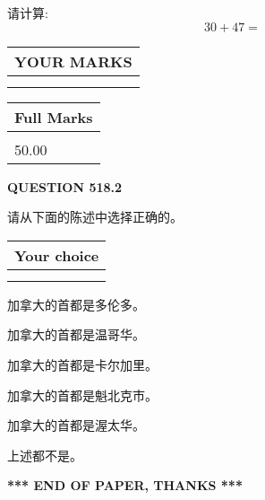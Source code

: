 \documentclass{ctexart}
\begin{document}
  
 
请计算:
\begin{equation}
30 +  %
47 = \nonumber
\end{equation}
 

 

 
  
\vspace{0.2in}
  
\noindent\begin{tabular}{|l|}
\hline
 YOUR MARKS  \\
\hline
 \\ 
 \\ 
\hline
\end{tabular}
\hspace{0.05in} \begin{tabular}{|l|}
\hline
 Full Marks  \\
\hline
 \\ 
50.00 \\
\hline
\end{tabular}
{\textbf{\Large{QUESTION
518.2 
}}}
  
  
请从下面的陈述中选择正确的。
  
  
\noindent\hspace{3.0in} \begin{tabular}{|l|}
\hline
Your choice \\
\hline
 \\ 
 \\ 
\hline
\end{tabular}
  
  
 
 
加拿大的首都是多伦多。
 
 
加拿大的首都是温哥华。
 
 
加拿大的首都是卡尔加里。
 
 
加拿大的首都是魁北克市。
 
 
加拿大的首都是渥太华。
 
 
 上述都不是。
 
 
   
   
 \vspace{0.2in}
 
   
   
   
   
\vspace{1.0in} 
{\textbf{\large{ *** END OF PAPER, THANKS *** }}} 
   
\end{document}
